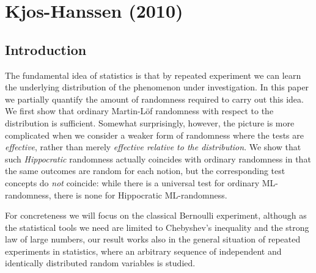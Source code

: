 %
\chapter{Kjos-Hanssen (2010)}
\section{Introduction}

The fundamental idea of statistics is that by repeated experiment we can learn the underlying distribution of the phenomenon under investigation. In this paper we partially quantify the amount of randomness required to carry out this idea. We first show that ordinary Martin-L\"of randomness with respect to the distribution is sufficient. Somewhat surprisingly, however, the picture is more complicated when we consider a weaker form of randomness where the tests are \emph{effective}, rather than merely \emph{effective relative to the distribution}. We show that such \emph{Hippocratic} randomness actually coincides with ordinary randomness in that the same outcomes are random for each notion, but the corresponding test concepts do \emph{not} coincide: while there is a universal test for ordinary ML-randomness, there is none for Hippocratic ML-randomness.  

For concreteness we will focus on the classical Bernoulli experiment, although as the statistical tools we need are limited to Chebyshev's inequality and the strong law of large numbers, our result works also in  the general situation of repeated experiments in statistics, where an arbitrary sequence of independent and identically distributed random variables is studied. 

